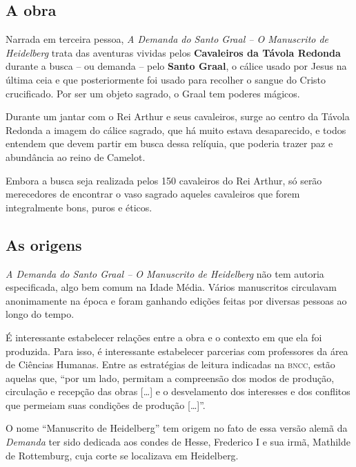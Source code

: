 \documentclass[11pt]{extarticle}
\begin{document}
\subsection{A obra}

Narrada em terceira pessoa, \emph{A Demanda do Santo Graal -- O
Manuscrito de Heidelberg} trata das aventuras vividas pelos
\textbf{Cavaleiros da Távola Redonda} durante a busca -- ou demanda --
pelo \textbf{Santo Graal}, o cálice usado por Jesus na última ceia e que
posteriormente foi usado para recolher o sangue do Cristo crucificado.
Por ser um objeto sagrado, o Graal tem poderes mágicos.

Durante um jantar com o Rei Arthur e seus cavaleiros, surge ao centro da
Távola Redonda a imagem do cálice sagrado, que há muito estava
desaparecido, e todos entendem que devem partir em busca dessa relíquia,
que poderia trazer paz e abundância ao reino de Camelot.




Embora a busca seja realizada pelos 150 cavaleiros do Rei Arthur, só
serão merecedores de encontrar o vaso sagrado aqueles cavaleiros que
forem integralmente bons, puros e éticos.

\subsection{As origens}

\emph{A Demanda do Santo Graal -- O Manuscrito de Heidelberg} não tem
autoria especificada, algo bem comum na Idade Média. Vários manuscritos
circulavam anonimamente na época e foram ganhando edições feitas por
diversas pessoas ao longo do tempo.

É interessante estabelecer relações entre a obra e o contexto em que ela
foi produzida. Para isso, é interessante estabelecer parcerias com
professores da área de Ciências Humanas. Entre as estratégias de leitura
indicadas na \textsc{bncc}, estão aquelas que, ``por um lado, permitam a
compreensão dos modos de produção, circulação e recepção das obras
{[}\ldots{}{]} e o desvelamento dos interesses e dos conflitos que permeiam
suas condições de produção {[}\ldots{}{]}''.

O nome ``Manuscrito de Heidelberg'' tem origem no fato de essa versão
alemã da \emph{Demanda} ter sido dedicada aos condes de Hesse, Frederico
I e sua irmã, Mathilde de Rottemburg, cuja corte se localizava em
Heidelberg.
\end{document}
